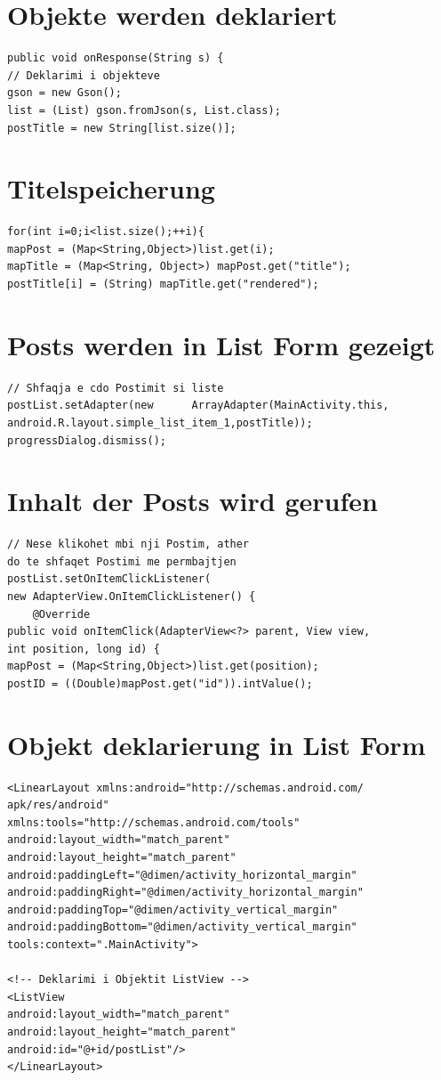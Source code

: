 \section{Objekte werden deklariert}
\begin{verbatim}
public void onResponse(String s) {
// Deklarimi i objekteve
gson = new Gson();
list = (List) gson.fromJson(s, List.class);
postTitle = new String[list.size()];
\end{verbatim}

\section{Titelspeicherung}
\begin{verbatim}
for(int i=0;i<list.size();++i){
mapPost = (Map<String,Object>)list.get(i);
mapTitle = (Map<String, Object>) mapPost.get("title");
postTitle[i] = (String) mapTitle.get("rendered");
\end{verbatim}

\section{Posts werden in List Form gezeigt}
\begin{verbatim}
// Shfaqja e cdo Postimit si liste
postList.setAdapter(new 	 ArrayAdapter(MainActivity.this,
android.R.layout.simple_list_item_1,postTitle));
progressDialog.dismiss();
\end{verbatim}

\section{Inhalt der Posts wird gerufen}
\begin{verbatim}
// Nese klikohet mbi nji Postim, ather 
do te shfaqet Postimi me permbajtjen
postList.setOnItemClickListener(
new AdapterView.OnItemClickListener() {
	@Override
public void onItemClick(AdapterView<?> parent, View view,
int position, long id) {
mapPost = (Map<String,Object>)list.get(position);
postID = ((Double)mapPost.get("id")).intValue();
\end{verbatim}

\section{Objekt deklarierung in List Form}
\begin{verbatim}
<LinearLayout xmlns:android="http://schemas.android.com/
apk/res/android"
xmlns:tools="http://schemas.android.com/tools"
android:layout_width="match_parent"
android:layout_height="match_parent"
android:paddingLeft="@dimen/activity_horizontal_margin"
android:paddingRight="@dimen/activity_horizontal_margin"
android:paddingTop="@dimen/activity_vertical_margin"
android:paddingBottom="@dimen/activity_vertical_margin"
tools:context=".MainActivity">

<!-- Deklarimi i Objektit ListView -->
<ListView
android:layout_width="match_parent"
android:layout_height="match_parent"
android:id="@+id/postList"/>
</LinearLayout>
\end{verbatim}

